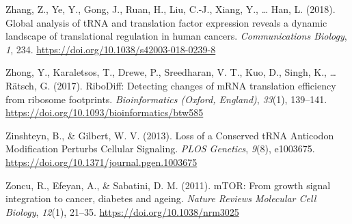 \documentclass[12pt,openany]{book}
\begin{document}
\hypertarget{ref-Zhang2018}{}
Zhang, Z., Ye, Y., Gong, J., Ruan, H., Liu, C.-J., Xiang, Y., \ldots{}
Han, L. (2018). Global analysis of tRNA and translation factor
expression reveals a dynamic landscape of translational regulation in
human cancers. \emph{Communications Biology}, \emph{1}, 234.
\url{https://doi.org/10.1038/s42003-018-0239-8}

\hypertarget{ref-Zhong2017}{}
Zhong, Y., Karaletsos, T., Drewe, P., Sreedharan, V. T., Kuo, D., Singh,
K., \ldots{} Rätsch, G. (2017). RiboDiff: Detecting changes of mRNA
translation efficiency from ribosome footprints. \emph{Bioinformatics
(Oxford, England)}, \emph{33}(1), 139--141.
\url{https://doi.org/10.1093/bioinformatics/btw585}

\hypertarget{ref-Zinshteyn2013}{}
Zinshteyn, B., \& Gilbert, W. V. (2013). Loss of a Conserved tRNA
Anticodon Modification Perturbs Cellular Signaling. \emph{PLOS
Genetics}, \emph{9}(8), e1003675.
\url{https://doi.org/10.1371/journal.pgen.1003675}

\hypertarget{ref-Zoncu2011}{}
Zoncu, R., Efeyan, A., \& Sabatini, D. M. (2011). mTOR: From growth
signal integration to cancer, diabetes and ageing. \emph{Nature Reviews
Molecular Cell Biology}, \emph{12}(1), 21--35.
\url{https://doi.org/10.1038/nrm3025}
\end{document}
